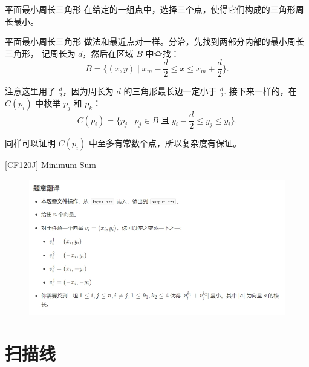 \documentclass{beamer}
\begin{document}
\begin{frame}{平面最小周长三角形}
    \small
    在给定的一组点中，选择三个点，使得它们构成的三角形周长最小。
\end{frame}

\begin{frame}{平面最小周长三角形}
    \small
    做法和最近点对一样。分治，先找到两部分内部的最小周长三角形，
    记周长为 $d$，然后在区域 $B$ 中查找：
    \begin{equation*}
        B=\{(x,y)\;|\;x_m-\frac{d}{2}\leq x\leq x_m+\frac{d}{2}\}.
    \end{equation*}

    注意这里用了 $\frac{d}{2}$，因为周长为 $d$ 的三角形最长边一定小于 $\frac{d}{2}$.
    \pause 接下来一样的，在 $C(p_i)$ 中枚举 $p_j$ 和 $p_k$：
    \begin{equation*}
        C(p_i)=\{p_j\;|\;p_j\in B \;\text{且}\; y_i-\frac{d}{2} \leq y_j \leq y_i\}.
    \end{equation*}

    同样可以证明 $C(p_i)$ 中至多有常数个点，所以复杂度有保证。
\end{frame}

\begin{frame}{[CF120J] Minimum Sum}
    \small
    \begin{figure}[H]
        \centering
        \includegraphics[width=\textwidth]{pic/minimumsum.png}
    \end{figure}
\end{frame}

\section{扫描线}
\end{document}
